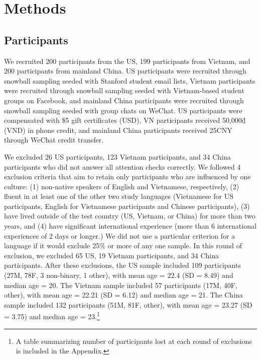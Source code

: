 \documentclass[10pt, letterpaper]{article}
\begin{document}
\hypertarget{methods}{%
\section{Methods}\label{methods}}

\hypertarget{participants}{%
\subsection{Participants}\label{participants}}

We recruited 200 participants from the US, 199 participants from
Vietnam, and 200 participants from mainland China. US participants were
recruited through snowball sampling seeded with Stanford student email
lists, Vietnam participants were recruited through snowball sampling
seeded with Vietnam-based student groups on Facebook, and mainland China
participants were recruited through snowball sampling seeded with group
chats on WeChat. US participants were compensated with \$5 gift
certificates (USD), VN participants received 50,000₫ (VND) in phone
credit, and mainland China participants received 25CNY through WeChat
credit transfer.

We excluded 26 US participants, 123 Vietnam participants, and 34 China
participants who did not answer all attention checks correctly. We
followed 4 exclusion criteria that aim to retain only participants who
are influenced by one culture: (1) non-native speakers of English and
Vietnamese, respectively, (2) fluent in at least one of the other two
study languages (Vietnamese for US participants, English for Vietnamese
participants and Chinese participants), (3) have lived outside of the
test country (US, Vietnam, or China) for more than two years, and (4)
have significant international experience (more than 6 international
experiences of 2 days or longer.) We did not use a particular criterion
for a language if it would exclude 25\% or more of any one sample. In
this round of exclusion, we excluded 65 US, 19 Vietnam participants, and
34 China participants. After these exclusions, the US sample included
109 participants (27M, 78F, 3 non-binary, 1 other), with mean age = 22.4
(SD = 8.49) and median age = 20. The Vietnam sample included 57
participants (17M, 40F, other), with mean age = 22.21 (SD = 6.12) and
median age = 21. The China sample included 132 participants (51M, 81F,
other), with mean age = 23.27 (SD = 3.75) and median age =
23.\footnote{A table summarizing number of participants lost at each
  round of exclusions is included in the Appendix.}
\end{document}

